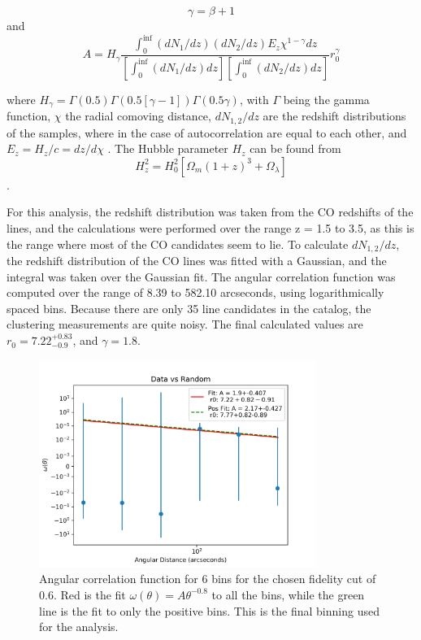 $$ \gamma = \beta + 1 $$ and $$ A = H_{\gamma}\frac{\int_{0}^{\inf} (dN_1/dz)(dN_2/dz)E_z\chi^{1 - \gamma} dz}{[\int_{0}^{\inf} (dN_1/dz)dz][\int_{0}^{\inf} (dN_2/dz)dz]}r_0^{\gamma}$$

where $H_{\gamma} = \Gamma(0.5)\Gamma(0.5[\gamma -1])\Gamma(0.5\gamma)$, with $\Gamma$ being the gamma function, $\chi$ the radial comoving distance, $dN_{1,2}/dz$ are the redshift distributions of the samples, where in the case of autocorrelation are equal to each other, and $E_z = H_z/c = dz/d\chi$ \cite{hickox2011clustering}. The Hubble parameter $H_z$ can be found from
$$H_z^2 = H_0^2[\Omega_m(1+z)^3 + \Omega_{\lambda}]$$ \cite{hickox2011clustering}.

For this analysis, the redshift distribution was taken from the CO redshifts of the lines, and the calculations were performed over the range z = 1.5 to 3.5, as this is the range where most of the CO candidates seem to lie. To calculate $dN_{1,2}/dz$, the redshift distribution of the CO lines was fitted with a Gaussian, and the integral was taken over the Gaussian fit. The angular correlation function was computed over the range of 8.39 to 582.10 arcseconds, using logarithmically spaced bins. Because there are only 35 line candidates in the catalog, the clustering measurements are quite noisy. The final calculated values are $r_0 = 7.22_{-0.9}^{+0.83}$, and $\gamma = 1.8$. 

\begin{figure}[!tbp]
\centering \includegraphics[width=90mm]{clustering_two/Data_vs_Random_10000_bin6_sn0_6_NFalse.png}
\caption{Angular correlation function for 6 bins for the chosen fidelity cut of 0.6. Red is the fit $\omega(\theta) = A\theta^{-0.8}$ to all the bins, while the green line is the fit to only the positive bins. This is the final binning used for the analysis. }
\label{fig:Angular_binnings}
\end{figure}

